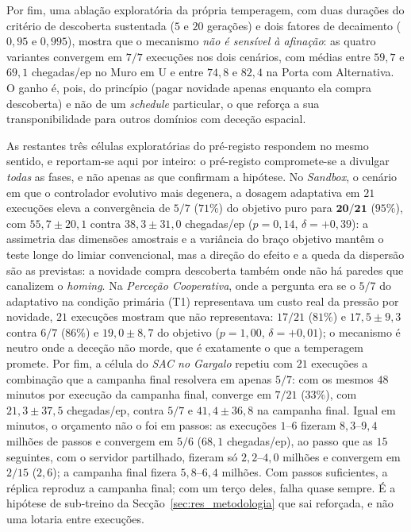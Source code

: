 \documentclass[12pt,reqno, twoside]{amsbook}
\theoremstyle{plain}
\numberwithin{equation}{chapter}
\numberwithin{section}{chapter}
\numberwithin{table}{chapter}
\numberwithin{figure}{chapter}
\begin{document}
Por fim, uma ablação exploratória da própria temperagem, com duas durações do critério de descoberta sustentada ($5$ e $20$ gerações) e dois fatores de decaimento ($0{,}95$ e $0{,}995$), mostra que o mecanismo \emph{não é sensível à afinação}: as quatro variantes convergem em $7/7$ execuções nos dois cenários, com médias entre $59{,}7$ e $69{,}1$ chegadas/ep no Muro em U e entre $74{,}8$ e $82{,}4$ na Porta com Alternativa. O ganho é, pois, do princípio (pagar novidade apenas enquanto ela compra descoberta) e não de um \textit{schedule} particular, o que reforça a sua transponibilidade para outros domínios com deceção espacial.

As restantes três células exploratórias do pré-registo respondem no mesmo sentido, e reportam-se aqui por inteiro: o pré-registo compromete-se a divulgar \emph{todas} as fases, e não apenas as que confirmam a hipótese. No \emph{Sandbox}, o cenário em que o controlador evolutivo mais degenera, a dosagem adaptativa em $21$ execuções eleva a convergência de $5/7$ ($71\%$) do objetivo puro para $\mathbf{20/21}$ ($95\%$), com $55{,}7 \pm 20{,}1$ contra $38{,}3 \pm 31{,}0$ chegadas/ep ($p = 0{,}14$, $\delta = +0{,}39$): a assimetria das dimensões amostrais e a variância do braço objetivo mantêm o teste longe do limiar convencional, mas a direção do efeito e a queda da dispersão são as previstas: a novidade compra descoberta também onde não há paredes que canalizem o \textit{homing}. Na \emph{Perceção Cooperativa}, onde a pergunta era se o $5/7$ do adaptativo na condição primária (T1) representava um custo real da pressão por novidade, $21$ execuções mostram que não representava: $17/21$ ($81\%$) e $17{,}5 \pm 9{,}3$ contra $6/7$ ($86\%$) e $19{,}0 \pm 8{,}7$ do objetivo ($p = 1{,}00$, $\delta = +0{,}01$); o mecanismo é neutro onde a deceção não morde, que é exatamente o que a temperagem promete. Por fim, a célula do \emph{SAC no Gargalo} repetiu com $21$ execuções a combinação que a campanha final resolvera em apenas $5/7$: com os mesmos $48$ minutos por execução da campanha final, converge em $7/21$ ($33\%$), com $21{,}3 \pm 37{,}5$ chegadas/ep, contra $5/7$ e $41{,}4 \pm 36{,}8$ na campanha final. Igual em minutos, o orçamento não o foi em passos: as execuções $1$--$6$ fizeram $8{,}3$--$9{,}4$ milhões de passos e convergem em $5/6$ ($68{,}1$ chegadas/ep), ao passo que as $15$ seguintes, com o servidor partilhado, fizeram só $2{,}2$--$4{,}0$ milhões e convergem em $2/15$ ($2{,}6$); a campanha final fizera $5{,}8$--$6{,}4$ milhões. Com passos suficientes, a réplica reproduz a campanha final; com um terço deles, falha quase sempre. É a hipótese de sub-treino da Secção~\ref{sec:res_metodologia} que sai reforçada, e não uma lotaria entre execuções.
\end{document}

